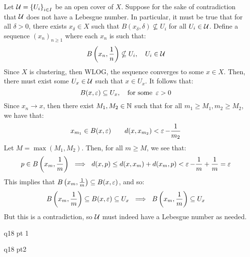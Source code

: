 \documentclass{article}
\begin{document}
\begin{soln}
    Let $ \mathcal{U} = \left\{{U_{i}}\right\}_{i \in I} $ be an open cover of $ X $.
    Suppose for the sake of contradiction that $ \mathcal{U} $ does not have a Lebesgue number.
    In particular, it must be true that for all $ \delta > 0 $, there exists $ x_{\delta} \in X $
    such that $ B(x_{\delta}, \delta) \nsubseteq U_{i} $ for all $ U_{i} \in \mathcal{U} $. \vsp
    Define a sequence $ (x_{n})_{n \geq 1} $ where each $ x_{n} $ is such that:
    \begin{equation*}
        B\left( x_{n}, \frac{1}{n} \right) \nsubseteq U_{i}, \quad U_{i} \in \mathcal{U}
    \end{equation*}
    Since $ X $ is clustering, then WLOG, the sequence converges to some $ x \in X $.
    Then, there must exist some $ U_{x} \in \mathcal{U} $ such that $ x \in U_{x} $. It follows that:
    \begin{equation*}
        B(x, \operatorname{\varepsilon}) \subseteq U_{x}, \quad \textrm{for some } \operatorname{\varepsilon} > 0
    \end{equation*}
    Since $ x_{n} \rightarrow x $, then there exist $ M_{1}, M_{2} \in \mathbb{N} $ such that
    for all $ m_{1} \geq M_{1}, m_{2} \geq M_{2} $, we have that:
    \begin{equation*}
        x_{m_{1}} \in B(x, \operatorname{\varepsilon}) \qquad d(x, x_{m_{2}}) < \operatorname{\varepsilon} - \frac{1}{m_{2}}
    \end{equation*}
    Let $ M = \max(M_{1}, M_{2}) $. Then, for all $ m \geq M $, we see that:
    \begin{equation*}
        p \in B \left( x_{m}, \frac{1}{m} \right)
        \ \implies \ d(x, p) \leq d(x, x_{m}) + d(x_{m}, p) < \operatorname{\varepsilon} - \frac{1}{m} + \frac{1}{m} = \operatorname{\varepsilon}
    \end{equation*}
    This implies that $ B \left( x_{m}, \frac{1}{m} \right) \subseteq B(x, \operatorname{\varepsilon}) $, and so:
    \begin{equation*}
        B \left( x_{m}, \frac{1}{m} \right) \subseteq B(x, \operatorname{\varepsilon}) \subseteq U_{x}
        \ \implies \ B \left( x_{m}, \frac{1}{m} \right) \subseteq U_{x}
    \end{equation*}
    But this is a contradiction, so $ \mathcal{U} $ must indeed have a Lebesgue number as needed.
\end{soln}

\newpage
{}

\begin{qu}
    q18 pt 1
\end{qu}

\begin{qu}
    q18 pt2
\end{qu}
\end{document}
